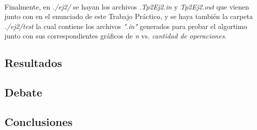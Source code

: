 \paragraph{}
Finalmente, en \textit{./ej2/} se hayan los archivos \textit{.Tp2Ej2.in} y \textit{Tp2Ej2.out} que vienen junto con en el enunciado de este Trabajo Práctico, y se haya también la carpeta \textit{./ej2/test} la cual contiene los archivos \textit{".in"} generados para probar el algortimo junto con sus correspondientes gráficos de \textit{n} vs. \textit{cantidad de operaciones}.

\subsection{Resultados}
\label{res2}

\subsection{Debate}
\label{deb2}

\subsection{Conclusiones}
\label{conc2}
